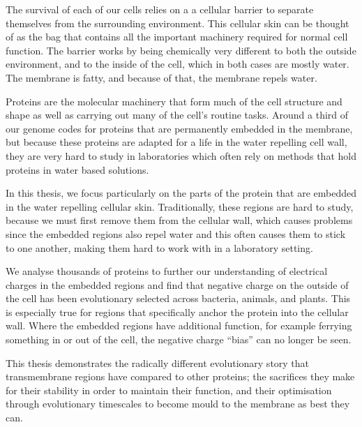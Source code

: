\documentclass[12pt,PhD,twoside]{muthesis}
\begin{document}

The survival of each of our cells relies on a a cellular barrier to separate themselves from the surrounding environment.
This cellular skin can be thought of as the bag that contains all the important machinery required for normal cell function.
The barrier works by being chemically very different to both the outside environment, and to the inside of the cell, which in both cases are mostly water.
The membrane is fatty, and because of that, the membrane repels water.

Proteins are the molecular machinery that form much of the cell structure and shape as well as carrying out many of the cell's routine tasks.
Around a third of our genome codes for proteins that are permanently embedded in the membrane, but because these proteins are adapted for a life in the water repelling cell wall, they are very hard to study in laboratories which often rely on methods that hold proteins in water based solutions.

In this thesis, we focus particularly on the parts of the protein that are embedded in the water repelling cellular skin.
Traditionally, these regions are hard to study, because we must first remove them from the cellular wall, which causes problems since the embedded regions also repel water and this often causes them to stick to one another, making them hard to work with in a laboratory setting.

We analyse thousands of proteins to further our understanding of electrical charges in the embedded regions and find that negative charge on the outside of the cell has been evolutionary selected across bacteria, animals, and plants.
This is especially true for regions that specifically anchor the protein into the cellular wall.
 Where the embedded regions have additional function, for example ferrying something in or out of the cell, the negative charge ``bias'' can no longer be seen.

 This thesis demonstrates the radically different evolutionary story that  transmembrane regions have compared to other proteins; the sacrifices they make for their stability in order to maintain their function, and their optimisation through evolutionary timescales to become mould to the membrane as best they can.




\afterabstract{} %
\end{document}

